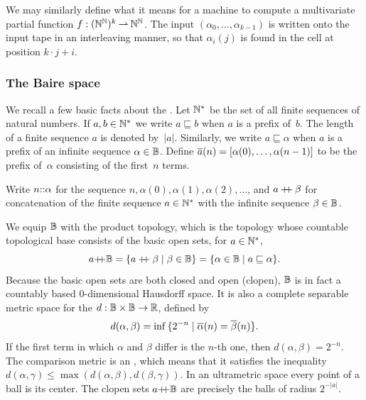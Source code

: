 We may similarly define what it means for a machine to compute a multivariate partial function $f : (\mathbb{N}^{\mathbb{N}})^k \mathbin{\rightharpoonup} \mathbb{N}^{\mathbb{N}}$. The input $(\alpha_0, \ldots, \alpha_{k-1})$ is written onto the input tape in an interleaving manner, so that $\alpha_i(j)$ is found in the cell at position $k \cdot j + i$.

\subsubsection{The Baire space}
\label{sec:baire-space}

We recall a few basic facts about the . Let $\mathbb{N}^{*}$ be the set of all finite sequences of natural numbers. If $a, b \in \mathbb{N}^{*}$
we write $a \sqsubseteq b$ when $a$ is a prefix of~$b$. The length of a finite sequence $a$ is denoted by~$|a|$. Similarly, we write $a \sqsubseteq \alpha$ when $a$ is a prefix of an infinite sequence $\alpha \in \mathbb{B}$. Define $\overline{a}(n) = [\alpha(0), \ldots,
\alpha(n-1)]$ to be the prefix of~$\alpha$ consisting of the first~$n$ terms.

Write $n {:}{:} \alpha$ for the sequence $n, \alpha(0), \alpha(1), \alpha(2), \ldots$, and $a \mathbin{{+}\!\!{+}} \beta$ for concatenation of the finite sequence $a \in \mathbb{N}^{*}$ with the infinite sequence $\beta \in \mathbb{B}$.

We equip $\mathbb{B}$ with the product topology, which is the topology whose countable topological base consists of the basic open sets, for $a \in \mathbb{N}^{*}$,
%
\begin{equation*}
  a{{+}\!\!{+}}\mathbb{B}
  = \{a \mathbin{{+}\!\!{+}} \beta \mid \beta \in \mathbb{B}\}
  = \{\alpha \in \mathbb{B} \mid a \sqsubseteq \alpha\}.
\end{equation*}
%
Because the basic open sets are both closed and open (clopen),
$\mathbb{B}$ is in fact a countably based $0$-dimensional Hausdorff space. It is also a complete
separable metric space for the  $d : \mathbb{B}
\times \mathbb{B} \to \mathbb{R}$, defined by
%
\begin{equation*}
  d(\alpha, \beta) = \inf \,\{2^{-n} \mid
    \overline{\alpha}(n) = \overline{\beta}(n)\}.
\end{equation*}
%
If the first term in which $\alpha$ and $\beta$ differ is the $n$-th
one, then $d(\alpha, \beta) = 2^{-n}$. The comparison metric is an
, which means that it satisfies the inequality $d(\alpha,
\gamma) \leq \max(d(\alpha, \beta), d(\beta, \gamma))$. In an ultrametric space every point of a ball is its center. The clopen sets $a{{+}\!\!{+}}\mathbb{B}$ are precisely the balls of radius $2^{-|a|}$.

